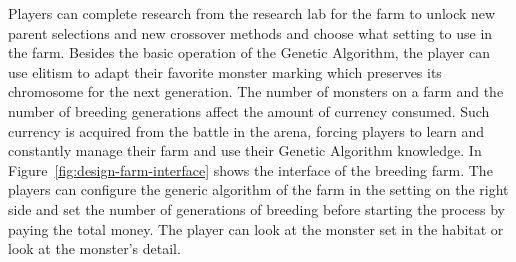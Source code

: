 \documentclass[12pt,oneside,openright,a4paper]{cpe-english-project}
\begin{document}
\begin{itemize}
\begin{enumerate}
	\begin{minipage}[c]{\textwidth}\centering
	\label{fig:design-monster-chromosome}
	\end{minipage}

Players can complete research from the research lab for the farm to unlock new parent selections and new crossover methods and choose what setting to use in the farm. Besides the basic operation of the Genetic Algorithm, the player can use elitism to adapt their favorite monster marking which preserves its chromosome for the next generation. The number of monsters on a farm and the number of breeding generations affect the amount of currency consumed. Such currency is acquired from the battle in the arena, forcing players to learn and constantly manage their farm and use their Genetic Algorithm knowledge. In Figure~\ref{fig:design-farm-interface} shows the interface of the breeding farm. The players can configure the generic algorithm of the farm in the setting on the right side and set the number of generations of breeding before starting the process by paying the total money. The player can look at the monster set in the habitat or look at the monster's detail.

	\begin{minipage}[c]{\textwidth}\centering
	\label{fig:design-farm-interface}
	\end{minipage}


\end{enumerate}
\end{itemize}
\end{document}
